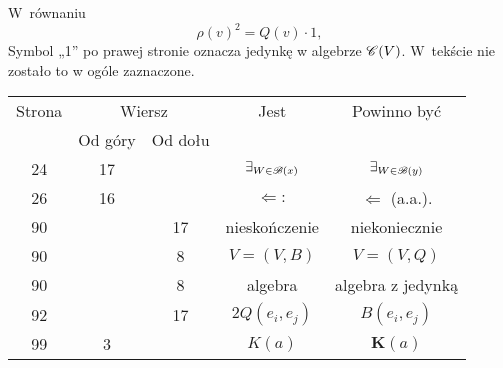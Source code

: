 \documentclass[a4paper,11pt]{article}
\begin{document}
\newpage


\vspace{0em}



\vspace{0em}


\noindent
{} W~równaniu
\begin{equation}
  \label{eq:MaurinAnalizaOgolneStrukturyVolII-01}
  \rho( v )^{ 2 } = Q( v ) \cdot 1,
\end{equation}
Symbol „1” po prawej stronie oznacza jedynkę w algebrze $\mathcal{C}( V )$.
W~tekście nie zostało to w ogóle zaznaczone.





\newpage


\begin{center}

  \begin{tabular}{|c|c|c|c|c|}
    \hline
    Strona & \multicolumn{2}{c|}{Wiersz} & Jest
                              & Powinno być \\ \cline{2-3}
    & Od góry & Od dołu & & \\
    \hline
    24  & 17 & & $\exists_{ \substack{ W \in \mathcal{B}( x ) } }$
           & $\exists_{ \substack{ W \in \mathcal{B}( y ) } }$ \\
    26  & 16 & & $\Leftarrow:$ & $\Leftarrow$ (a.a.). \\
    90  & & 17 & nieskończenie & niekoniecznie \\
    90  & &  8 & $V = ( V, B )$ & $V = ( V, Q )$ \\
    90  & &  8 & algebra & algebra z jedynką \\
    92  & & 17 & $2Q( e_{ i }, e_{ j } )$ & $B( e_{ i }, e_{ j } )$ \\
    99  &  3 & & $K( a )$ & $\mathbf{K}( a )$ \\
    \hline
  \end{tabular}

\end{center}
\end{document}
